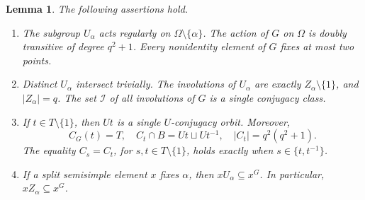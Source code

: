\documentclass[11pt]{amsart}
\numberwithin{equation}{section}
\newtheorem{lemma}[theorem]{Lemma}
\theoremstyle{definition}
\theoremstyle{remark}
\newcommand{\I}{\mathcal I}
\begin{document}
\begin{lemma}\label{lem:structure}
The following assertions hold.
\begin{enumerate}[label=\textup{(\roman*)},leftmargin=*]
\item The subgroup $U_\alpha$ acts regularly on $\Omega\setminus\{\alpha\}$. 
The action of $G$ on $\Omega$ is doubly transitive of degree $q^2+1$.
Every nonidentity element of $G$ fixes at most two points.
\item Distinct $U_\alpha$ intersect trivially. 
The involutions of $U_\alpha$ are exactly $Z_\alpha\setminus\{1\}$, and $|Z_\alpha|=q$.
The set $\I$ of all involutions of $G$ is a single conjugacy class.
\item If $t\in T\setminus\{1\}$, then $Ut$ is a single $U$-conjugacy orbit. Moreover,
\begin{equation}\label{eq:split-data}
 C_G(t)=T,\quad C_t\cap B=Ut\sqcup U{t^{-1}},\quad
 |C_t|=q^2(q^2+1).
\end{equation}
The equality $C_s=C_t$, for $s,t\in T\setminus\{1\}$, holds exactly when $s\in\{t,t^{-1}\}$.
\item If a split semisimple element $x$ fixes $\alpha$, then $xU_\alpha\subseteq x^G$. In particular, $xZ_\alpha\subseteq x^G$.
\end{enumerate}
\end{lemma}
\end{document}

